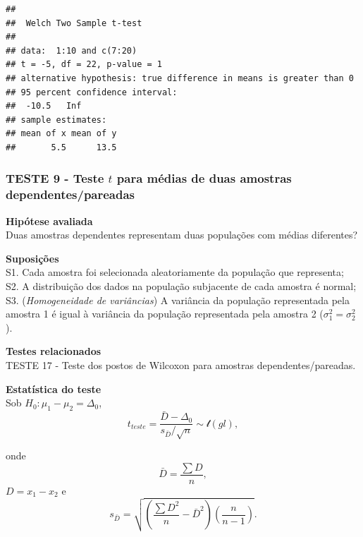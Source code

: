 \documentclass[
]{book}
\theoremstyle{definition}
\theoremstyle{definition}
\theoremstyle{definition}
\theoremstyle{remark}
\begin{document}
\begin{verbatim}
## 
##  Welch Two Sample t-test
## 
## data:  1:10 and c(7:20)
## t = -5, df = 22, p-value = 1
## alternative hypothesis: true difference in means is greater than 0
## 95 percent confidence interval:
##  -10.5   Inf
## sample estimates:
## mean of x mean of y 
##       5.5      13.5
\end{verbatim}

\hypertarget{teste-9---teste-t-para-muxe9dias-de-duas-amostras-dependentespareadas}{%
\subsubsection*{\texorpdfstring{TESTE 9 - Teste \(t\) para médias de duas amostras dependentes/pareadas}{TESTE 9 - Teste t para médias de duas amostras dependentes/pareadas}}\label{teste-9---teste-t-para-muxe9dias-de-duas-amostras-dependentespareadas}}

\textbf{Hipótese avaliada}\\
Duas amostras dependentes representam duas populações com médias diferentes?

\textbf{Suposições}\\
S1. Cada amostra foi selecionada aleatoriamente da população que representa;\\
S2. A distribuição dos dados na população subjacente de cada amostra é normal;\\
S3. (\emph{Homogeneidade de variâncias}) A variância da população representada pela amostra 1 é igual à variância da população representada pela amostra 2 (\(\sigma_1^2=\sigma_2^2\)).

\textbf{Testes relacionados}\\
TESTE 17 - Teste dos postos de Wilcoxon para amostras dependentes/pareadas.

\textbf{Estatística do teste}\\
Sob \(H_0: \mu_1-\mu_2 = \Delta_0\),
\begin{equation}
t_{teste} = \frac{\bar{D}-\Delta_0}{s_{\bar{D}}/\sqrt{n}} \sim \mathcal{t}(gl),
\label{eq:t-teste-medias-dep}
\end{equation}

onde \[\bar{D} = \frac{\sum D}{n},\] \(D=x_1-x_2\) e
\begin{equation}
s_{\bar{D}} = \sqrt{\left( \frac{\sum D^2}{n} - \bar{D}^2 \right) \left( \frac{n}{n-1} \right)}.
\label{eq:sD-medias-dep}
\end{equation}
\end{document}
